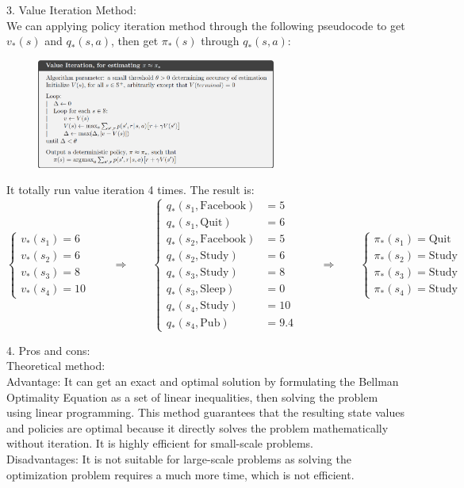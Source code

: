 \begin{homeworkProblem}
3. Value Iteration Method: \\
We can applying policy iteration method through the following pseudocode to get $v_*(s)$ and $q_*(s,a)$, then get $\pi_*(s)$ through $q_*(s,a)$:
\begin{figure}[!htbp]
    \centering
    \includegraphics[width=0.7\textwidth]{./figure/value_iteration_pseudocode}
\end{figure}

It totally run value iteration 4 times. The result is:
$$\begin{cases}
v_*(s_1) = 6 \\
v_*(s_2) = 6 \\
v_*(s_3) = 8 \\
v_*(s_4) = 10
\end{cases} \qquad \Rightarrow \qquad \begin{cases}
q_*(s_1, \text{Facebook}) &= 5 \\
q_*(s_1, \text{Quit}) &= 6 \\
q_*(s_2, \text{Facebook}) &= 5 \\
q_*(s_2, \text{Study}) &= 6 \\
q_*(s_3, \text{Study}) &= 8 \\
q_*(s_3, \text{Sleep}) &= 0 \\
q_*(s_4, \text{Study}) &= 10 \\
q_*(s_4, \text{Pub}) &= 9.4
\end{cases} \qquad \Rightarrow \qquad \begin{cases}
\pi_*(s_1) = \text{Quit} \\
\pi_*(s_2) = \text{Study} \\
\pi_*(s_3) = \text{Study} \\
\pi_*(s_4) = \text{Study}
\end{cases}$$

4. Pros and cons: \\
Theoretical method: \\
Advantage: It can get an exact and optimal solution by formulating the Bellman Optimality Equation as a set of linear inequalities, then solving the problem using linear programming. This method guarantees that the resulting state values and policies are optimal because it directly solves the problem mathematically without iteration. It is highly efficient for small-scale problems. \\
Disadvantages: It is not suitable for large-scale problems as solving the optimization problem requires a much more time, which is not efficient. \\


\end{homeworkProblem}
